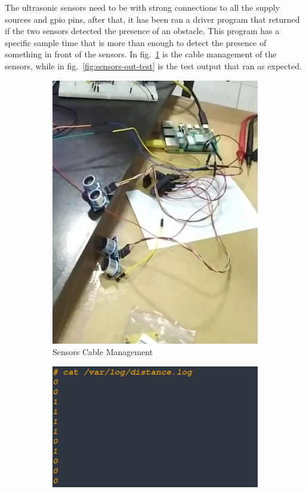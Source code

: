 The ultrasonic sensors need to be with strong connections to all the supply sources and \gls{gpio} pins, after that, it has been ran a driver program that returned if the two sensors detected the presence of an obstacle. 
This program has a specific sample time that is more than enough to detect the presence of something in front of the sensors.
In fig.~\ref{fig:sensors-test} is the cable management of the sensors, while in fig.~\ref{fig:sensors-out-test} is the test output that ran as expected.
%
\begin{figure}[htb!]
  \centering
  \begin{subfigure}{.4\textwidth}
    \includegraphics[width=\textwidth]{img/sensors-test.jpg}%
  \caption{Sensors Cable Management}%
  \label{fig:sensors-test}
  \end{subfigure}
  \begin{subfigure}{.5\textwidth}
    \includegraphics[width=\textwidth]{img/sensors-out-test.jpg}%

\end{subfigure}
\end{figure}
